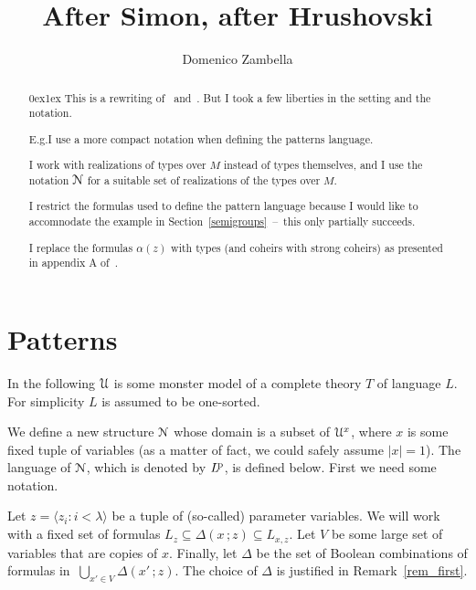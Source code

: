 \documentclass{amsproc}
\author{Domenico Zambella}
\def\U{\EuScript U}
\def\N{\EuScript N}
\theoremstyle{mio}
\newcommand\branch{}
\begin{document}
\title{After Simon, after Hrushovski}
\maketitle
\raggedbottom

\begin{abstract}\parindent0ex\parskip1ex
  This is a rewriting of~\cite{Si} and~\cite{Hr}.
  But I took a few liberties in the setting and the notation.
  
  E.g.\@ I use a more compact notation when defining the patterns language.

  I work with realizations of types over $M$ instead of types themselves, and I use the notation $\N$ for a suitable set of realizations of the types over $M$.

  I restrict the formulas used to define the pattern language because I would like to accomnodate the example in Section~\ref{semigroups}~--~this only partially succeeds.

  I replace the formulas $\alpha(z)$ with types (and coheirs with strong coheirs) as presented in appendix A of~\cite{Hr}.
\end{abstract}


\section{Patterns}
\label{patterns}

\def\ceq#1#2#3{\noindent\parbox[t]{26ex}{$\displaystyle #1$}\parbox{5ex}{\hfil $#2$}{$\displaystyle #3$}}

In the following $\U$ is some monster model of a complete theory $T$ of language $L$.
For simplicity $L$ is assumed to be one-sorted.

We define a new structure $\N$ whose domain is a subset of $\U^x$, where $x$ is some fixed tuple of variables (as a matter of fact, we could safely assume $|x|=1$).
The language of $\N$, which is denoted by $L^{\rm\! p}$, is defined below.
First we need some notation.

Let $z=\langle z_i:i<\lambda\rangle$ be a tuple of (so-called) parameter variables.
We will work with a fixed set of formulas $L_z\subseteq\Delta(x\,;z)\subseteq L_{x,z}$.
Let $V$ be some large set of variables that are copies of $x$.
Finally, let $\Delta$ be the set of Boolean combinations of formulas in $\ \bigcup_{x'\in V}\Delta(x'\,;z)$.
The choice of $\Delta$ is justified in Remark~\ref{rem_first}.
\end{document}
